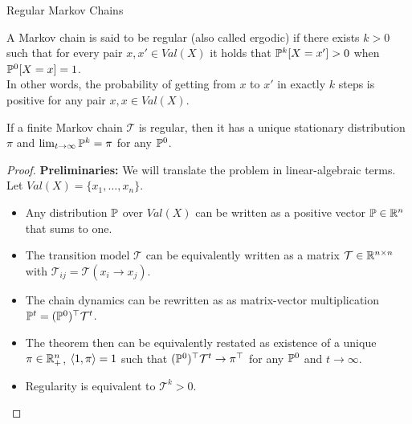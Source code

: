 \begin{frame}{Regular Markov Chains}
    \begin{definition}
        A Markov chain is said to be regular (also called ergodic) if there exists $k>0$ such that for every pair $x,x' \in Val(X)$ it holds that $\Pb^k[X = x'] > 0$ when $\Pb^0[X = x] = 1$.
        \\ \pause
        In other words, the probability of getting from $x$ to $x'$ in exactly $k$ steps is positive for any pair $x,x \in Val(X)$.
    \end{definition}
    \pause
    \begin{theorem}
        If a finite Markov chain $\mathcal{T}$ is regular, then it has a unique stationary distribution $\pi$ and $\lim_{t \rightarrow \infty} \Pb^k = \pi$ for any $\Pb^0$.
    \end{theorem}
    \pause
    \begin{proof}
        \textbf{Preliminaries:} We will translate the problem in linear-algebraic terms.
        Let $Val(X) =  \{x_1,\ldots,x_n\}$.
        \begin{itemize}
            \pause \item Any distribution $\Pb$ over $Val(X)$ can be written as a positive vector $\Pb \in \R^n$ that sums to one.
            \pause \item The transition model $\mathcal{T}$ can be equivalently written as a matrix $\mathcal{T} \in \mathbb{R}^{n \times n}$ with $\mathcal{T}_{ij} = \mathcal{T}(x_i \rightarrow x_j)$.
            \pause \item The chain dynamics can be rewritten as as matrix-vector multiplication $\Pb^{t} = (\Pb^0)^\top \mathcal{T}^t$.
            \pause \item The theorem then can be equivalently restated as existence of a unique $\pi \in \mathbb{R}^n_+$, $\langle 1, \pi \rangle =1$ such that $(\Pb^0)^\top \mathcal{T}^t  \rightarrow \pi^\top$ for any $\Pb^0$ and $t \rightarrow \infty$.
            \pause \item Regularity is equivalent to $\mathcal{T}^k > 0$.
        \end{itemize}
    \end{proof}
\end{frame}

